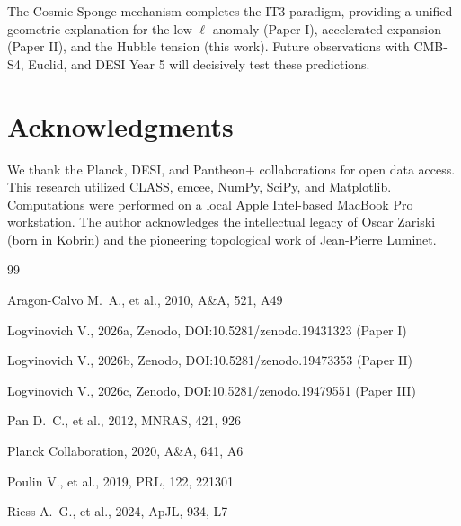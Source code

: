 \documentclass[12pt,a4paper]{article}
\begin{document}
The Cosmic Sponge mechanism completes the IT3 paradigm, providing a unified geometric explanation for the low-$\ell$ anomaly (Paper I), accelerated expansion (Paper II), and the Hubble tension (this work). Future observations with CMB-S4, Euclid, and DESI Year 5 will decisively test these predictions.

\section*{Acknowledgments}

We thank the Planck, DESI, and Pantheon+ collaborations for open data access. This research utilized CLASS, emcee, NumPy, SciPy, and Matplotlib. Computations were performed on a local Apple Intel-based MacBook Pro workstation. The author acknowledges the intellectual legacy of Oscar Zariski (born in Kobrin) and the pioneering topological work of Jean-Pierre Luminet.

\begin{thebibliography}{99}

Aragon-Calvo M.~A., et al., 2010, A\&A, 521, A49

Logvinovich V., 2026a, Zenodo, DOI:10.5281/zenodo.19431323 (Paper I)

Logvinovich V., 2026b, Zenodo, DOI:10.5281/zenodo.19473353 (Paper II)

Logvinovich V., 2026c, Zenodo, DOI:10.5281/zenodo.19479551 (Paper III)

Pan D.~C., et al., 2012, MNRAS, 421, 926

Planck Collaboration, 2020, A\&A, 641, A6

Poulin V., et al., 2019, PRL, 122, 221301

Riess A.~G., et al., 2024, ApJL, 934, L7

\end{thebibliography}
\end{document}
